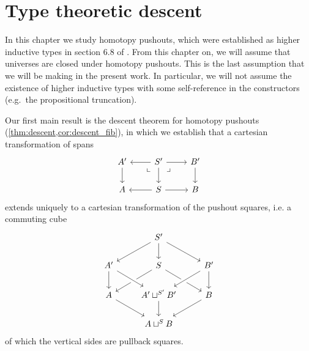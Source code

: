 \chapter{Type theoretic descent}

In this chapter we study homotopy pushouts, which were established as higher inductive types in section 6.8 of \cite{hottbook}. From this chapter on, we will assume that universes are closed under homotopy pushouts. This is the last assumption that we will be making in the present work. In particular, we will not assume the existence of higher inductive types with some self-reference in the constructors (e.g.~the propositional truncation).

Our first main result is the descent theorem for homotopy pushouts (\cref{thm:descent,cor:descent_fib}), in which we establish that a cartesian transformation of spans
\begin{equation*}
\begin{tikzcd}
A' \arrow[d]  & S' \arrow[l] \arrow[r] \arrow[d] \arrow[dl,phantom,"\llcorner" very near start] \arrow[dr,phantom,"\lrcorner" very near start] & B' \arrow[d] \\
A & S \arrow[l] \arrow[r] & B
\end{tikzcd}
\end{equation*}
extends uniquely to a cartesian transformation of the pushout squares, i.e. a commuting cube
\begin{equation*}
\begin{tikzcd}
& S' \arrow[dl] \arrow[dr] \arrow[d] \\
A' \arrow[d] & S \arrow[dl] \arrow[dr] & B' \arrow[dl,crossing over] \arrow[d] \\
A \arrow[dr] & A'\sqcup^{S'}B' \arrow[d] \arrow[from=ul,crossing over] & B \arrow[dl] \\
& A\sqcup^S B
\end{tikzcd}
\end{equation*}
of which the vertical sides are pullback squares. 

